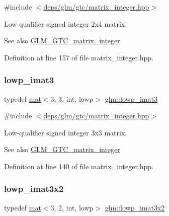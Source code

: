 {\ttfamily \#include $<$\hyperlink{matrix__integer_8hpp}{deps/glm/gtc/matrix\+\_\+integer.\+hpp}$>$}

Low-\/qualifier signed integer 2x4 matrix. \begin{DoxySeeAlso}{See also}
\hyperlink{group__gtc__matrix__integer}{G\+L\+M\+\_\+\+G\+T\+C\+\_\+matrix\+\_\+integer} 
\end{DoxySeeAlso}


Definition at line 157 of file matrix\+\_\+integer.\+hpp.

\mbox{\label{group__gtc__matrix__integer_gab66eef83170eea33b73938c19a82e4a0}} 
\subsubsection{\texorpdfstring{lowp\+\_\+imat3}{lowp\_imat3}}
{\footnotesize\ttfamily typedef \hyperlink{structglm_1_1mat}{mat}$<$3, 3, int, lowp$>$ \hyperlink{group__gtc__matrix__integer_gab66eef83170eea33b73938c19a82e4a0}{glm\+::lowp\+\_\+imat3}}



{\ttfamily \#include $<$\hyperlink{matrix__integer_8hpp}{deps/glm/gtc/matrix\+\_\+integer.\+hpp}$>$}

Low-\/qualifier signed integer 3x3 matrix. \begin{DoxySeeAlso}{See also}
\hyperlink{group__gtc__matrix__integer}{G\+L\+M\+\_\+\+G\+T\+C\+\_\+matrix\+\_\+integer} 
\end{DoxySeeAlso}


Definition at line 140 of file matrix\+\_\+integer.\+hpp.

\mbox{\label{group__gtc__matrix__integer_ga96983291e90cfeaecde4409ef1ec74dd}} 
\subsubsection{\texorpdfstring{lowp\+\_\+imat3x2}{lowp\_imat3x2}}
{\footnotesize\ttfamily typedef \hyperlink{structglm_1_1mat}{mat}$<$3, 2, int, lowp$>$ \hyperlink{group__gtc__matrix__integer_ga96983291e90cfeaecde4409ef1ec74dd}{glm\+::lowp\+\_\+imat3x2}}



